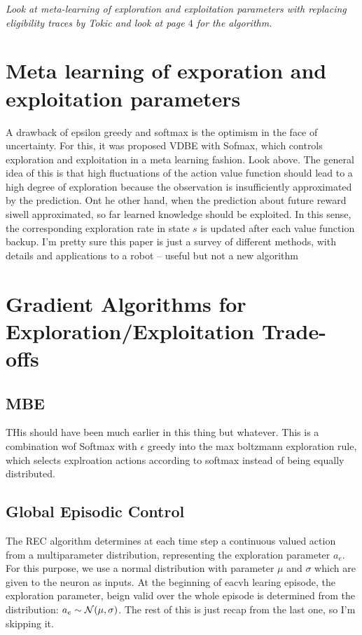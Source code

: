 \documentclass[10.5pt]{article}
\begin{document}
\emph{Look at meta-learning of exploration and exploitation parameters with replacing eligibility traces by Tokic and look at page $4$ for the algorithm.}
\section{Meta learning of exporation and exploitation parameters}
A drawback of epsilon greedy and softmax is the optimism in the face of uncertainty. For this, it was proposed VDBE with Sofmax, which controls exploration and exploitation in a meta learning fashion. Look above. The general idea of this is that high fluctuations of the action value function should lead to a high degree of exploration because the observation is insufficiently approximated by the prediction. Ont he other hand, when the prediction about future reward siwell approximated, so far learned knowledge should be exploited. In this sense, the corresponding exploration rate in state $s$ is updated after each value function backup. I'm pretty sure this paper is just a survey of different methods, with details and applications to a robot -- useful but not a new algorithm


\section{Gradient Algorithms for Exploration/Exploitation Trade-offs}
\subsection{MBE}

THis should have been much earlier in this thing but whatever. This is a combination wof Softmax with $\epsilon$ greedy into the max boltzmann exploration rule, which selects explroation actions according to softmax instead of being equally distributed. 
\subsection{Global Episodic Control}
The REC algorithm determines at each time step a continuous valued action from a multiparameter distribution, representing the exploration parameter $a_e$. For this purpose, we use a normal distribution with parameter $\mu$ and $\sigma$ which are given to the neuron as inputs. At the beginning of eacvh learing episode, the exploration parameter, beign valid over the whole episode is determined from the distribution: $a_e\sim {\cal N}(\mu, \sigma)$. The rest of this is just recap from the last one, so I'm skipping it. 
\end{document}
